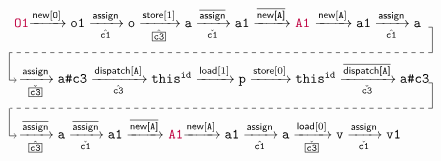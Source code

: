 \begin{equation} 
\label{eq:ex2-inv-c1}
  \centering
\begin{tabular}{l} 
\commentfont{O1}$\xrightarrow{\new[\texttt{O}]} \texttt{o1}
\xrightarrow[\hat{\texttt{c1}}]{\assign} \texttt{o} 
\xrightarrow[\hat{\boxed{\texttt{c3}}}]{\store[1]} \texttt{a} 
\xrightarrow[\check{\texttt{c1}}]{\iassign} \texttt{a1}
\xrightarrow{\inewfield{\texttt{A}}}
$
\commentfont{A1}
$ \xrightarrow{\new[\texttt{A}]} \texttt{a1} 
\xrightarrow[\hat{\texttt{c1}}]{\assign} \texttt{a}$ \\[5ex]
\begin{tikzpicture}[-, remember picture,overlay]
\def\lx{10.4}\def\ly{1.4}
\def\dy{.76}\def\ny{.065}
\draw(\lx, \ly) -- (\lx+.1, \ly) -- (\lx+.1, \dy);
\draw[dashed] (\lx+.1, \dy) -- (-.12,\dy);
\draw(-.12,\dy) -- (-.12, \ny);
\draw[->] (-.12, \ny) -- (0.06, \ny);
\end{tikzpicture}
$\xrightarrow[\check{\boxed{\texttt{c3}}}]{\assign} \texttt{a\#c3}
\xrightarrow[\hat{\texttt{c3}}]{\indispatch[\texttt{A}]} \texttt{this}^{\texttt{id}} 
\xrightarrow{\load[1]} \texttt{p} \xrightarrow{\store[\ret]} \texttt{this}^{\texttt{id}} 
\xrightarrow[\check{\texttt{c3}}]{\iindispatchfield{\texttt{A}}} \texttt{a\#c3}
$ \\[5ex]
\begin{tikzpicture}[-, remember picture,overlay]
\def\lx{10.4}\def\ly{1.4}
\def\dy{.76}\def\ny{.065}
\draw(\lx, \ly) -- (\lx+.1, \ly) -- (\lx+.1, \dy);
\draw[dashed] (\lx+.1, \dy) -- (-.1,\dy);
\draw(-.12,\dy) -- (-.12, \ny);
\draw[->] (-.12, \ny) -- (0.06, \ny);
\end{tikzpicture}
$\xrightarrow[\hat{\boxed{\texttt{c3}}}]{\iassign} \texttt{a}
\xrightarrow[\check{\texttt{c1}}]{\iassign} \texttt{a1} 
\xrightarrow{\inewfield{\texttt{A}}}$
\commentfont{A1}$\xrightarrow{\new[\texttt{A}]} \texttt{a1}
\xrightarrow[\hat{\texttt{c1}}]{\assign} \texttt{a}
\xrightarrow[\check{\boxed{\texttt{c3}}}]{\load[\ret]}
\texttt{v} \xrightarrow[\check{\texttt{c1}}]{\assign} 
\texttt{v1}
$
\end{tabular}
\end{equation}

\bigskip

